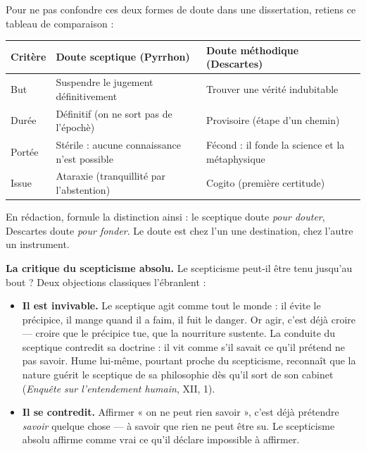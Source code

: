 \documentclass[11pt]{article}
\begin{document}
\begin{methode}
Pour ne pas confondre ces deux formes de doute dans une dissertation, retiens ce tableau de comparaison :
\begin{center}
\begin{tabularx}{\linewidth}{|l|X|X|}
\hline
\rowcolor{popblueL} \textbf{Critère} & \textbf{Doute sceptique (Pyrrhon)} & \textbf{Doute méthodique (Descartes)} \\
\hline
But & Suspendre le jugement définitivement & Trouver une vérité indubitable \\
\hline
Durée & Définitif (on ne sort pas de l'épochè) & Provisoire (étape d'un chemin) \\
\hline
Portée & Stérile : aucune connaissance n'est possible & Fécond : il fonde la science et la métaphysique \\
\hline
Issue & Ataraxie (tranquillité par l'abstention) & Cogito (première certitude) \\
\hline
\end{tabularx}
\end{center}
En rédaction, formule la distinction ainsi : le sceptique doute \emph{pour douter}, Descartes doute \emph{pour fonder}. Le doute est chez l'un une destination, chez l'autre un instrument.
\end{methode}

\textbf{La critique du scepticisme absolu.} Le scepticisme peut-il être tenu jusqu'au bout ? Deux objections classiques l'ébranlent :

\begin{itemize}
\item \textbf{Il est invivable.} Le sceptique agit comme tout le monde : il évite le précipice, il mange quand il a faim, il fuit le danger. Or agir, c'est déjà croire — croire que le précipice tue, que la nourriture sustente. La conduite du sceptique contredit sa doctrine : il vit comme s'il savait ce qu'il prétend ne pas savoir. Hume lui-même, pourtant proche du scepticisme, reconnaît que la nature guérit le sceptique de sa philosophie dès qu'il sort de son cabinet (\emph{Enquête sur l'entendement humain}, XII, 1).
\item \textbf{Il se contredit.} Affirmer « on ne peut rien savoir », c'est déjà prétendre \emph{savoir} quelque chose — à savoir que rien ne peut être su. Le scepticisme absolu affirme comme vrai ce qu'il déclare impossible à affirmer.
\end{itemize}
\end{document}
